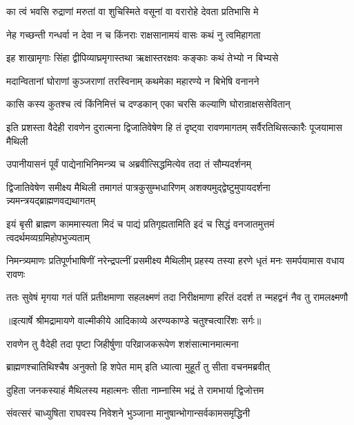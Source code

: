 \twolineshloka
{का त्वं भवसि रुद्राणां मरुतां वा शुचिस्मिते}
{वसूनां वा वरारोहे देवता प्रतिभासि मे} %

\twolineshloka
{नेह गच्छन्ती गन्धर्वा न देवा न च किंनराः}
{राक्षसानामयं वासः कथं नु त्वमिहागता} %

\twolineshloka
{इह शाखामृगाः सिंहा द्वीपिव्याघ्रमृगास्तथा}
{ऋक्षास्तरक्षवः कङ्काः कथं तेभ्यो न बिभ्यसे} %

\twolineshloka
{मदान्वितानां घोराणां कुञ्जराणां तरस्विनाम्}
{कथमेका महारण्ये न बिभेषि वनानने} %

\twolineshloka
{कासि कस्य कुतश्च त्वं किंनिमित्तं च दण्डकान्}
{एका चरसि कल्याणि घोरान्राक्षससेवितान्} %

\threelineshloka
{इति प्रशस्ता वैदेही रावणेन दुरात्मना}
{द्विजातिवेषेण हि तं दृष्ट्वा रावणमागतम्}
{सर्वैरतिथिसत्कारैः पूजयामास मैथिली} %

\twolineshloka
{उपानीयासनं पूर्वं पाद्येनाभिनिमन्त्र्य च}
{अब्रवीत्सिद्धमित्येव तदा तं सौम्यदर्शनम्} %

\fourlineindentedshloka
{द्विजातिवेषेण समीक्ष्य मैथिली}
{ तमागतं पात्रकुसुम्भधारिणम्}
{अशक्यमुद्द्वेष्टुमुपायदर्शना}
{न्न्यमन्त्रयद्ब्राह्मणवद्यथागतम्} %

\fourlineindentedshloka
{इयं बृसी ब्राह्मण काममास्यता}
{मिदं च पाद्यं प्रतिगृह्यतामिति}
{इदं च सिद्धं वनजातमुत्तमं}
{ त्वदर्थमव्यग्रमिहोपभुज्यताम्} %

\fourlineindentedshloka
{निमन्त्र्यमाणः प्रतिपूर्णभाषिणीं}
{ नरेन्द्रपत्नीं प्रसमीक्ष्य मैथिलीम्}
{प्रहस्य तस्या हरणे धृतं मनः}
{ समर्पयामास वधाय रावणः} %

\fourlineindentedshloka
{ततः सुवेषं मृगया गतं पतिं}
{ प्रतीक्षमाणा सहलक्ष्मणं तदा}
{निरीक्षमाणा हरितं ददर्श त}
{न्महद्वनं नैव तु रामलक्ष्मणौ} %


{॥इत्यार्षे श्रीमद्रामायणे वाल्मीकीये आदिकाव्ये अरण्यकाण्डे चतुश्चत्वारिंशः सर्गः॥}


\twolineshloka
{रावणेन तु वैदेही तदा पृष्टा जिहीर्षुणा}
{परिव्राजकरूपेण शशंसात्मानमात्मना} %

\twolineshloka
{ब्राह्मणश्चातिथिश्चैष अनुक्तो हि शपेत माम्}
{इति ध्यात्वा मुहूर्तं तु सीता वचनमब्रवीत्} %

\twolineshloka
{दुहिता जनकस्याहं मैथिलस्य महात्मनः}
{सीता नाम्नास्मि भद्रं ते रामभार्या द्विजोत्तम} %

\twolineshloka
{संवत्सरं चाध्युषिता राघवस्य निवेशने}
{भुञ्जाना मानुषान्भोगान्सर्वकामसमृद्धिनी} %

